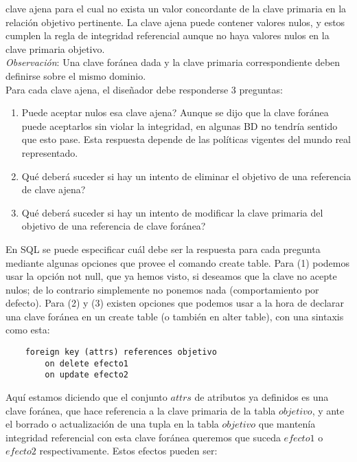 \documentclass[a4paper]{article}
\begin{document}
clave ajena para el cual no exista un valor concordante de la clave primaria en la relaci\'on
objetivo pertinente. La clave ajena puede contener valores nulos, y estos cumplen la regla
de integridad referencial aunque no haya valores nulos en la clave primaria objetivo.\\
\textit{Observaci\'on}: Una clave for\'anea dada y la clave primaria correspondiente deben
definirse sobre el mismo dominio. \\
Para cada clave ajena, el diseñador debe responderse 3 preguntas:
\begin{enumerate}
    \item Puede aceptar nulos esa clave ajena? Aunque se dijo que la clave for\'anea puede
    aceptarlos sin violar la integridad, en algunas BD no tendr\'ia sentido que esto pase.
    Esta respuesta depende de las pol\'iticas vigentes del mundo real representado.
    \item Qu\'e deber\'a suceder si hay un intento de eliminar el objetivo de una referencia
    de clave ajena?
    \item Qu\'e deber\'a suceder si hay un intento de modificar la clave primaria del
    objetivo de una referencia de clave for\'anea?
\end{enumerate}
En SQL se puede especificar cu\'al debe ser la respuesta para cada pregunta mediante algunas
opciones que provee el comando create table. Para (1) podemos usar la opci\'on not null,
que ya hemos visto, si deseamos que la clave no acepte nulos; de lo contrario simplemente
no ponemos nada (comportamiento por defecto). Para (2) y (3) existen opciones que podemos
usar a la hora de declarar una clave for\'anea en un create table (o tambi\'en en alter
table), con una sintaxis como esta:
\begin{lstlisting}
    foreign key (attrs) references objetivo
        on delete efecto1
        on update efecto2
\end{lstlisting}
Aqu\'i estamos diciendo que el conjunto $attrs$ de atributos ya definidos es una clave
for\'anea, que hace referencia a la clave primaria de la tabla $objetivo$, y ante el
borrado o actualizaci\'on de una tupla en la tabla $objetivo$ que manten\'ia integridad
referencial con esta clave for\'anea queremos que suceda $efecto1$ o $efecto2$
respectivamente. Estos efectos pueden ser:
\end{document}

